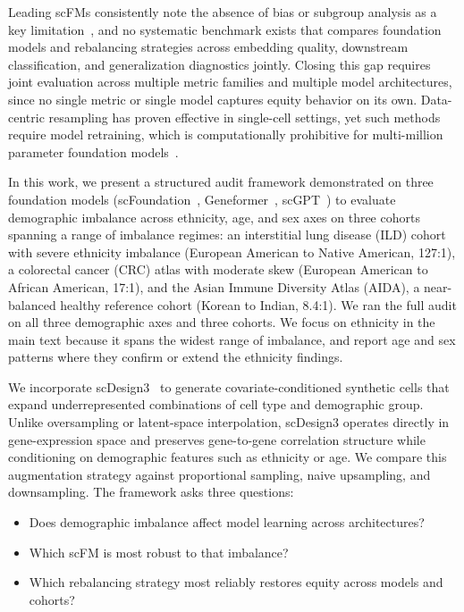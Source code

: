 \documentclass[sigconf]{acmart}
\begin{document}
Leading scFMs consistently note the absence of bias or subgroup analysis as a key limitation~\cite{hao2024scfoundation,zeng2025cellfm,baek2025single}, and no systematic benchmark exists that compares foundation models and rebalancing strategies across embedding quality, downstream classification, and generalization diagnostics jointly. Closing this gap requires joint evaluation across multiple metric families and multiple model architectures, since no single metric or single model captures equity behavior on its own. Data-centric resampling has proven effective in single-cell settings, yet such methods require model retraining, which is computationally prohibitive for multi-million parameter foundation models~\cite{navidi2025adaptive}.

In this work, we present a structured audit framework demonstrated on three foundation models (scFoundation~\cite{hao2024scfoundation}, Geneformer~\cite{theodoris2023geneformer}, scGPT~\cite{cui2024scgpt}) to evaluate demographic imbalance across ethnicity, age, and sex axes on three cohorts spanning a range of imbalance regimes: an interstitial lung disease (ILD) cohort with severe ethnicity imbalance (European American to Native American, 127:1), a colorectal cancer (CRC) atlas with moderate skew (European American to African American, 17:1), and the Asian Immune Diversity Atlas (AIDA), a near-balanced healthy reference cohort (Korean to Indian, 8.4:1). We ran the full audit on all three demographic axes and three cohorts. We focus on ethnicity in the main text because it spans the widest range of imbalance, and report age and sex patterns where they confirm or extend the ethnicity findings.

We incorporate scDesign3~\cite{song2023scdesign3} to generate covariate-conditioned synthetic cells that expand underrepresented combinations of cell type and demographic group. Unlike oversampling or latent-space interpolation, scDesign3 operates directly in gene-expression space and preserves gene-to-gene correlation structure while conditioning on demographic features such as ethnicity or age. We compare this augmentation strategy against proportional sampling, naive upsampling, and downsampling. The framework asks three questions:

\begin{itemize}
    \item[(Q1)] Does demographic imbalance affect model learning across architectures?
    \item[(Q2)] Which scFM is most robust to that imbalance?
    \item[(Q3)] Which rebalancing strategy most reliably restores equity across models and cohorts?
\end{itemize}
\end{document}
